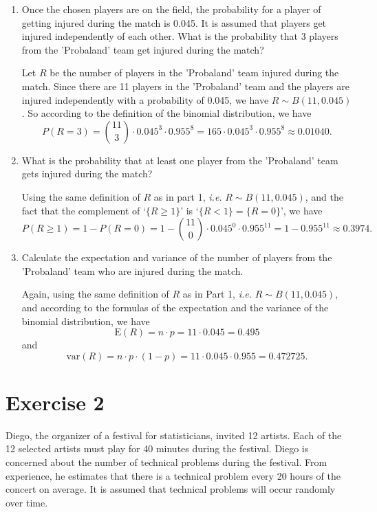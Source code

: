 \documentclass[12pt,thmsa]{article}\usepackage[]{graphicx}\usepackage[]{color}
\begin{document}
\begin{enumerate}
\item Once the chosen players are on the field, the probability for a player of getting injured during the match is 0.045. It is assumed that players get injured
independently of each other. What is the probability that 3 players from the 'Probaland' team get injured during the match?

Let $R$ be the number of players in the 'Probaland' team injured during the match. Since there are 11 players in the 'Probaland' team and the players are injured independently with a probability of 0.045, we have $R \sim B(11,0.045) $. So according to the definition of the binomial distribution, we have
\begin{equation*}
P(R=3)=\binom{11}{3} \cdot 0.045^3 \cdot 0.955^8 =  165 \cdot 0.045^3 \cdot 0.955^8 \approx 0.01040.
\end{equation*}




\item What is the probability that at least one player from the 'Probaland' team gets injured during the match?

Using the same definition of $R$ as in part 1,
 {\it i.e.} $R\sim B(11,0.045)$, and the fact that the complement of `$\{R\geq 1\}$' is `$\{R<1\}=\{R=0\}$', we have
\begin{equation*}
P(R\geq 1)= 1- P(R=0) = 1 - \binom{11}{0} \cdot 0.045^0 \cdot 0.955^{11} =  1- 0.955^{11} \approx 0.3974.
\end{equation*}
\item Calculate the expectation and variance of the number of players from the 'Probaland' team who are injured during the match.

Again, using the same definition of $ R $ as in Part 1, {\it i.e.} $R\sim B(11,0.045)$, and according to the formulas of the expectation and the variance of the binomial distribution, we have
$$
\text{E}(R) =n\cdot p= 11 \cdot 0.045 = 0.495
$$
and
$$
\text{var}(R) =  n\cdot p\cdot (1-p)= 11 \cdot 0.045 \cdot 0.955 = 0.472725.
$$
\end{enumerate}




\section*{Exercise 2}
Diego, the organizer of a festival for statisticians, invited 12 artists. Each of the 12 selected artists must play for 40 minutes during the festival. Diego is concerned about the number of technical problems during the festival. From experience, he estimates that there is a technical problem every 20 hours of the concert on average. It is assumed that technical problems will occur randomly over time.
\end{document}
